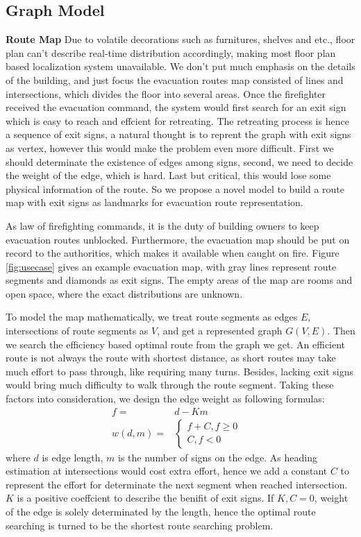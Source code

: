 \documentclass[conference]{IEEEtran}
\begin{document}
    \subsection{Graph Model}
    {\bf Route Map}    
    Due to volatile decorations such as furnitures, shelves and etc., floor plan can't describe real-time distribution accordingly, making most floor plan based localization system unavailable. We don't put much emphasis on the details of the building, and just focus the evacuation routes map consisted of lines and intersections, which divides the floor into several areas. Once the firefighter received the evacuation command, the system would first search for an exit sign which is easy to reach and effcient for retreating. The retreating process is hence a sequence of exit signs, a natural thought is to reprent the graph with exit signs as vertex, however this would make the problem even more difficult. First we should determinate the existence of edges among signs, second, we need to decide the weight of the edge, which is hard. Last but critical, this would lose some physical information of the route. So we propose a novel model to build a route map with exit signs as landmarks for evacuation route representation.


    As law of firefighting commands, it is the duty of building owners to keep evacuation routes unblocked. Furthermore, the evacuation map should be put on record to the authorities, which makes it available when caught on fire. Figure \ref{fig:usecase} gives an example evacuation map, with gray lines represent route segments and diamonds as exit signs. The empty areas of the map are rooms and open space, where the exact distributions are unknown.

    To model the map mathematically, we treat route segments as edges $E$, intersections of route segments as $V$, and get a represented graph $G(V,E)$. Then we search the efficiency based optimal route from the graph we get. An efficient route is not always the route with shortest distance, as short routes may take much effort to pass through, like requiring many turns. Besides, lacking exit signs would bring much difficulty to walk through the route segment. Taking these factors into consideration, we design the edge weight as following formulas:
    \begin{eqnarray}  
    	f =& d - K m   \\
       w(d,m)=&\left\{   
      \begin{array}{rcl} 
         f  + C,    {f\geq0}\\
         C, {f<0}&
      \end{array}
     \right.  
    \end{eqnarray}
    where $d$ is edge length, $m$ is the number of signs on the edge. As heading estimation at intersections would cost extra effort, hence we add a constant $C$ to represent the effort for determinate the next segment when reached intersection. $K$ is a positive coeffcient to describe the benifit of exit signs. If $K,C=0$, weight of the edge is solely determinated by the length, hence the optimal route searching is turned to be the shortest route searching problem.
\end{document}
